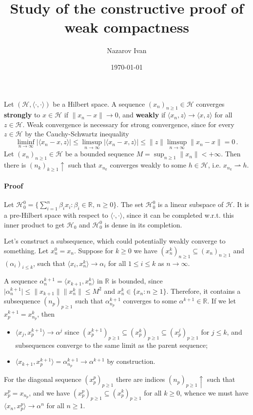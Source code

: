 \documentclass[a4paper]{article}
\title{Study of the constructive proof of weak compactness}
\author{Nazarov Ivan}
\date{\today}
\newcommand{\Hcal}{\mathcal{H}}
\newcommand{\real}{\mathbb{R}}
\begin{document}
\maketitle

Let $(\Hcal, \langle\cdot,\cdot\rangle)$ be a Hilbert space. A sequence $(x_n)_{n\geq1} 
\in \Hcal$ converges {\bf strongly} to $x\in\Hcal$ if $\|x_n - x\| \to 0$, and {\bf
weakly} if $\langle x_n, z \rangle \to \langle x, z\rangle$ for all $z\in \Hcal$.
Weak convergence is necessary for strong convergence, since for every $z\in \Hcal$
by the Cauchy-Schwartz inequality
\begin{equation*}
  \liminf_{n\to \infty}
    \lvert \langle x_n - x, z\rangle \rvert
    \leq \limsup_{n\to \infty}
      \lvert \langle x_n - x, z\rangle \rvert
    \leq \|z\| \limsup_{n\to \infty} \|x_n - x \|
    = 0
    \,.
\end{equation*}
Let $(x_n)_{n\geq1} \in \Hcal$ be a bounded sequence $M = \sup_{n\geq1} \|x_n\| < +\infty$.
Then there is $(n_k)_{k\geq1}\uparrow$ such that $x_{n_k}$ converges weakly to some
$h \in \Hcal$, i.e. $x_{n_k}\rightharpoonup h$.

\paragraph{Proof} %
\label{par:proof}

Let $\Hcal^0_0 = \{\sum_{i=1}^n \beta_i x_i \colon \beta_i \in \real,\,n\geq 0 \}$.
The set $\Hcal^0_0$ is a linear subspace of $\Hcal$. It is a pre-Hilbert space with
respect to $\langle\cdot, \cdot \rangle$, since it can be completed w.r.t. this inner
product to get $\Hcal_0$ and $\Hcal^0_0$ is dense in its completion.

Let's construct a subsequence, which could potentially weakly converge to something.
Let $x^0_n = x_n$. Suppose for $k\geq 0$ we have $(x^k_n)_{n\geq 1} \subseteq (x_n)_{n\geq 1}$
and $(\alpha_i)_{i\leq k}$, such that $\langle x_i, x^k_n\rangle \to \alpha_i$ for
all $1\leq i\leq k$ as $n\to \infty$.

A sequence $\alpha^{k+1}_n = \langle x_{k+1}, x^k_n \rangle$ in $\real$ is bounded,
since $\lvert\alpha^{k+1}_n\rvert \leq \|x_{k+1}\| \|x^k_n\| \leq M^2$ and $x^k_n \in
\{x_n\colon n\geq 1\}$. Therefore, it contains a subsequence $(n_p)_{p\geq1}$ such that
$\alpha^{k+1}_{n_p}$ converges to some $\alpha^{k+1} \in \real$. If we let $x^{k+1}_p
= x^k_{n_p}$, then
\begin{itemize}
  \item $\langle x_j, x^{k+1}_p \rangle \to \alpha^j$ since $(x^{k+1}_p)_{p\geq 1}
  \subseteq (x^k_p)_{p\geq 1} \subseteq (x^j_p)_{p\geq 1}$ for $j\leq k$, and
  subsequences converge to the same limit as the parent sequence;
  \item $\langle x_{k+1}, x^{k+1}_p \rangle = \alpha^{k+1}_{n_p} \to \alpha^{k+1}$
  by construction.
\end{itemize}
For the diagonal sequence $(x^p_p)_{p\geq1}$ there are indices $(n_p)_{p\geq1} \uparrow$
such that $x^p_p = x_{n_p}$, and we have $(x^p_p)_{p\geq1} \subseteq (x^k_p)_{p\geq1}$
for all $k\geq 0$, whence we must have  $\langle x_n, x^p_p \rangle \to \alpha^n$
for all $n\geq 1$.
\end{document}
